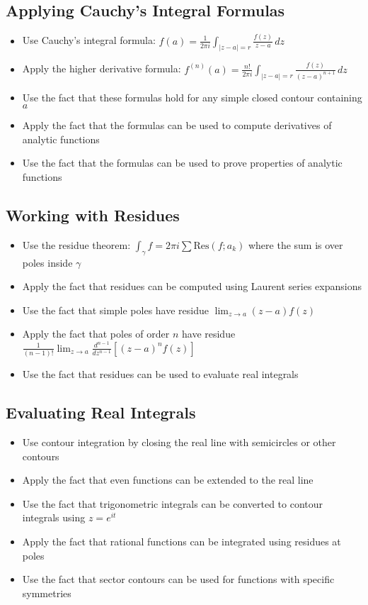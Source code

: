 \subsection*{Applying Cauchy's Integral Formulas}
\begin{itemize}
\item Use Cauchy's integral formula: $f(a) = \frac{1}{2\pi i} \int_{|z-a|=r} \frac{f(z)}{z-a} \, dz$
\item Apply the higher derivative formula: $f^{(n)}(a) = \frac{n!}{2\pi i} \int_{|z-a|=r} \frac{f(z)}{(z-a)^{n+1}} \, dz$
\item Use the fact that these formulas hold for any simple closed contour containing $a$
\item Apply the fact that the formulas can be used to compute derivatives of analytic functions
\item Use the fact that the formulas can be used to prove properties of analytic functions
\end{itemize}

\subsection*{Working with Residues}
\begin{itemize}
\item Use the residue theorem: $\int_\gamma f = 2\pi i \sum \text{Res}(f; a_k)$ where the sum is over poles inside $\gamma$
\item Apply the fact that residues can be computed using Laurent series expansions
\item Use the fact that simple poles have residue $\lim_{z \to a} (z-a)f(z)$
\item Apply the fact that poles of order $n$ have residue $\frac{1}{(n-1)!} \lim_{z \to a} \frac{d^{n-1}}{dz^{n-1}}[(z-a)^n f(z)]$
\item Use the fact that residues can be used to evaluate real integrals
\end{itemize}

\subsection*{Evaluating Real Integrals}
\begin{itemize}
\item Use contour integration by closing the real line with semicircles or other contours
\item Apply the fact that even functions can be extended to the real line
\item Use the fact that trigonometric integrals can be converted to contour integrals using $z = e^{it}$
\item Apply the fact that rational functions can be integrated using residues at poles
\item Use the fact that sector contours can be used for functions with specific symmetries
\end{itemize}

